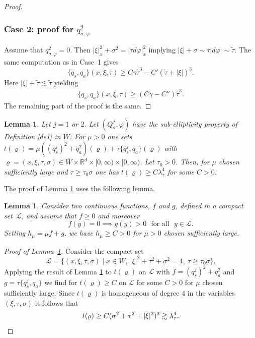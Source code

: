 \documentclass[10pt]{amsart}
\let\sep\mid
\theoremstyle{plain}
\newtheorem{lemma}[theorem]{Lemma}
\theoremstyle{definition}
\def\R{\mathbb{R}}
\newcommand{\suff}{sufficiently\xspace}
\let\csp\gamma
\let\y\varrho
\newcommand{\ovl}[1]{\overline{#1}}
\newcommand{\lsc}{\lambda_\tau}
\newcommand{\Qsig}{Q_{\sigma}}
\newcommand{\qconj}{q_{\sigma,\varphi}}
\newcommand{\qs}{q_{s}}
\newcommand{\qa}{q_{a}}
\begin{document}
\begin{proof}
\subsubsection*{Case 2: proof for ${\qconj^2}$}
Assume
that $\qconj^2=0$. Then $|\xi|_x^2+\sigma^2=|\tau
d\varphi|_x^2$ implying $|\xi|+\sigma\sim\tau|d\varphi| \sim \tilde{\tau}$.
The same computation as in Case~1 gives
\begin{equation*}
\{\qs, \qa\}(x,\xi,\tau) \geq C \csp\tilde{\tau}^3-C'(\tilde{\tau}+|\xi|)^3.
\end{equation*}
Here $|\xi|+\tilde{\tau}\lesssim \tilde{\tau}$ yielding
\begin{align*}
\{\qs, \qa\}(x,\xi,\tau) \geq (C \csp-C'')\tilde{\tau}^3.
\end{align*}
The remaining part of the proof is the same.
\end{proof}

\begin{lemma}\label{urg1}
Let $j=1$ or $2$. Let $(\Qsig^j,\varphi)$ have the sub-ellipticity property
of Definition \ref{de1} in $\ovl{W}$. For $\mu>0$ one sets
$t(\y)=\mu
((\qs^j)^2+\qa^2)(\y)+\tau\{\qs^j,\qa\}(\y)$
with
$\y=(x,\xi,\tau,\sigma)\in\ovl{W}\times\R^d\times[0,\infty)\times[0,\infty)$.
Let $\tau_0 >0$. Then, for $\mu$ chosen \suff large and
$\tau\geq \tau_0\sigma$ one has $t(\y)\geq C\lsc^4$
for some $C>0$.
\end{lemma}
The proof of Lemma \ref{urg1} uses the following lemma.

\begin{lemma}\label{urg2}
Consider two continuous functions, $f$ and $g$, defined in a compact set~$\mathscr{L}$, and assume that $f\geq 0$ and moreover
\[
f(y)=0\implies g(y)>0~~~\text{for all}~~~y\in\mathscr{L}.
\]
Setting $h_{\mu}=\mu f+g$, we have $h_{\mu}\geq C>0$ for $\mu>0$ chosen \suff large.
\end{lemma}
\begin{proof}[Proof of Lemma~\ref{urg1}]
Consider the compact set
\begin{equation*}
\mathscr{L}=
\{(x,\xi,\tau,\sigma)\sep x\in\ovl{W},\
|\xi|^2+\tau^2+\sigma^2=1, \ \tau\geq \tau_0\sigma\}.
\end{equation*}
Applying the result of Lemma \ref{urg2} to $t(\y)$ on
$\mathscr{L}$ with $f=(\qs^j)^2+\qa^2$ and $g=\tau\{\qs^j,
\qa\}$ we find for $t(\y)\geq C$ on $\mathscr{L}$ for some
$C>0$ for $\mu$
chosen \suff large. Since $t(\y)$ is homogeneous of degree $4$
in the variables $(\xi,\tau,\sigma)$ it follows that
\[
t(\y)\geq C(\sigma^2+\tau^2+|\xi|^2)^2\gtrsim \lsc^4.\qedhere
\]
\end{proof}
\end{document}

